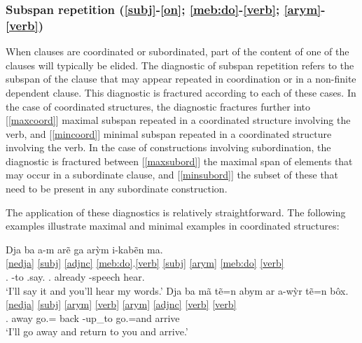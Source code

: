 \documentclass[output=paper]{langscibook}
\begin{document}
\subsubsection{Subspan repetition (\ref{subj}-\ref{on}; \ref{meb:do}-\ref{verb}; \ref{arym}-\ref{verb})}
\label{subspan}

When clauses are coordinated or subordinated, part of the content of one of the clauses will typically be elided. The diagnostic of subspan repetition refers to the subspan of the clause that may appear repeated in coordination or in a non-finite dependent clause. This diagnostic is fractured according to each of these cases. In the case of coordinated structures, the diagnostic fractures further into [\ref{maxcoord}] maximal subspan repeated in a coordinated structure involving the verb, and [\ref{mincoord}] minimal subspan repeated in a coordinated structure involving the verb. In the case of constructions involving subordination, the diagnostic is fractured between [\ref{maxsubord}] the maximal span of elements that may occur in a subordinate clause, and [\ref{minsubord}] the subset of these that need to be present in any subordinate construction.

The application of these diagnostics is relatively straightforward. The following examples illustrate maximal and minimal examples in coordinated structures:


\ea
    \ea\label{maxcoord-ex}\glll Dja ba a-m arẽ ga arỳm i-kabẽn ma.\\
                  \ref{nedja} \ref{subj} \ref{adjnc} \ref{meb:do}.\ref{verb} \ref{subj} \ref{arym} \ref{meb:do} \ref{verb}\\
                  \Fut{} \First.\Nom{} \Second-to \Third.say.\Fin{} \Second.\Nom{} already \First-speech hear.\Fin\\
                \glt `I'll say it and you'll hear my words.'
    \ex\label{mincoord-ex}\glll Dja ba mã tẽ=n abym ar a-wỳr tẽ=n bôx.\\
                  \ref{nedja} \ref{subj} \ref{arym} \ref{verb} \ref{arym} \ref{adjnc} {} \ref{verb} \ref{verb}\\
                  \Fut{} \First.\Nom{} away go.\Fin=\Ss{} back \Pauc{} \Second-up\_to go.\Fin=and arrive\\
                \glt `I'll go away and return to you and arrive.'
    \z
\z
\end{document}
